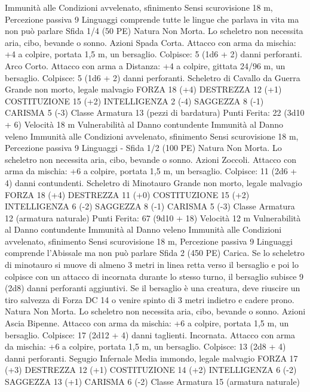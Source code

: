 \begin{multicols}{2}
Immunità alle Condizioni avvelenato, sfinimento
Sensi scurovisione 18 m, Percezione passiva 9
Linguaggi comprende tutte le lingue che parlava in vita ma non
può parlare
Sfida 1/4 (50 PE)
Natura Non Morta. Lo scheletro non necessita aria, cibo,
bevande o sonno.
Azioni
Spada Corta. Attacco con arma da mischia: +4 a colpire, portata
1,5 m, un bersaglio.
Colpisce: 5 (1d6 + 2) danni perforanti.
Arco Corto. Attacco con arma a Distanza: +4 a colpire, gittata
24/96 m, un bersaglio.
Colpisce: 5 (1d6 + 2) danni perforanti.
Scheletro di Cavallo da Guerra
Grande non morto, legale malvagio
FORZA 18 (+4)
DESTREZZA 12 (+1)
COSTITUZIONE 15 (+2)
INTELLIGENZA 2 (-4)
SAGGEZZA 8 (-1)
CARISMA 5 (-3)
Classe Armatura 13 (pezzi di bardatura)
\hspace*{0pt}\hfill{Punti Ferita}: 22 (3d10 + 6)
Velocità 18 m
Vulnerabilità al Danno contundente
Immunità al Danno veleno
Immunità alle Condizioni avvelenato, sfinimento
Sensi scurovisione 18 m, Percezione passiva 9
Linguaggi -
Sfida 1/2 (100 PE)
Natura Non Morta. Lo scheletro non necessita aria, cibo,
bevande o sonno.
Azioni
Zoccoli. Attacco con arma da mischia: +6 a colpire, portata 1,5
m, un bersaglio.
Colpisce: 11 (2d6 + 4) danni contundenti.
Scheletro di Minotauro
Grande non morto, legale malvagio
FORZA 18 (+4)
DESTREZZA 11 (+0)
COSTITUZIONE 15 (+2)
INTELLIGENZA 6 (-2)
SAGGEZZA 8 (-1)
CARISMA 5 (-3)
Classe Armatura 12 (armatura naturale)
\hspace*{0pt}\hfill{Punti Ferita}: 67 (9d10 + 18)
Velocità 12 m
Vulnerabilità al Danno contundente
Immunità al Danno veleno
Immunità alle Condizioni avvelenato, sfinimento
Sensi scurovisione 18 m, Percezione passiva 9
Linguaggi comprende l’Abissale ma non può parlare
Sfida 2 (450 PE)
Carica. Se lo scheletro di minotauro si muove di almeno 3 metri
in linea retta verso il bersaglio e poi lo colpisce con un attacco di
incornata durante lo stesso turno, il bersaglio subisce 9 (2d8)
danni perforanti aggiuntivi. Se il bersaglio è una creatura, deve
riuscire un tiro salvezza di Forza DC 14 o venire spinto di 3
metri indietro e cadere prono.
Natura Non Morta. Lo scheletro non necessita aria, cibo,
bevande o sonno.
Azioni
Ascia Bipenne. Attacco con arma da mischia: +6 a colpire,
portata 1,5 m, un bersaglio.
Colpisce: 17 (2d12 + 4) danni taglienti.
Incornata. Attacco con arma da mischia: +6 a colpire, portata
1,5 m, un bersaglio.
Colpisce: 13 (2d8 + 4) danni perforanti.
Segugio Infernale
Media immondo, legale malvagio
FORZA 17 (+3)
DESTREZZA 12 (+1)
COSTITUZIONE 14 (+2)
INTELLIGENZA 6 (-2)
SAGGEZZA 13 (+1)
CARISMA 6 (-2)
Classe Armatura 15 (armatura naturale)

\end{multicols}
